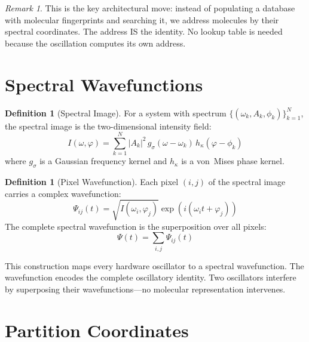 \documentclass[twocolumn,10pt,a4paper]{article}
\theoremstyle{plain}
\theoremstyle{definition}
\newtheorem{definition}[theorem]{Definition}
\theoremstyle{remark}
\newtheorem{remark}[theorem]{Remark}
\begin{document}
\begin{remark}
This is the key architectural move: instead of populating a database with molecular fingerprints and searching it, we address molecules by their spectral coordinates. The address IS the identity. No lookup table is needed because the oscillation computes its own address.
\end{remark}

\section{Spectral Wavefunctions}
\label{sec:wavefunctions}

\begin{definition}[Spectral Image]
\label{def:spectral_image}
For a system with spectrum $\{(\omega_k, A_k, \phi_k)\}_{k=1}^{N}$, the spectral image is the two-dimensional intensity field:
\begin{equation}
    I(\omega, \varphi) = \sum_{k=1}^{N} |A_k|^2\, g_\sigma(\omega - \omega_k)\, h_\kappa(\varphi - \phi_k)
\end{equation}
where $g_\sigma$ is a Gaussian frequency kernel and $h_\kappa$ is a von~Mises phase kernel.
\end{definition}

\begin{definition}[Pixel Wavefunction]
\label{def:wavefunction}
Each pixel $(i,j)$ of the spectral image carries a complex wavefunction:
\begin{equation}
    \Psi_{ij}(t) = \sqrt{I(\omega_i, \varphi_j)} \exp\!\left(i(\omega_i t + \varphi_j)\right)
\end{equation}
The complete spectral wavefunction is the superposition over all pixels:
\begin{equation}
    \Psi(t) = \sum_{i,j} \Psi_{ij}(t)
\end{equation}
\end{definition}

This construction maps every hardware oscillator to a spectral wavefunction. The wavefunction encodes the complete oscillatory identity. Two oscillators interfere by superposing their wavefunctions---no molecular representation intervenes.

\section{Partition Coordinates}
\label{sec:partition_coords}
\end{document}
